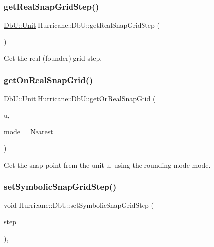 \subsubsection{\texorpdfstring{get\+Real\+Snap\+Grid\+Step()}{getRealSnapGridStep()}}
{\footnotesize\ttfamily \mbox{\hyperlink{group__DbUGroup_ga4fbfa3e8c89347af76c9628ea06c4146}{Db\+U\+::\+Unit}} Hurricane\+::\+Db\+U\+::get\+Real\+Snap\+Grid\+Step (\begin{DoxyParamCaption}{ }\end{DoxyParamCaption})\hspace{0.3cm}{\ttfamily [static]}}

Get the real (founder) grid step. \mbox{\label{group__DbUGroup_ga8746e486f153aa37ee469c1604eba5c0}} 
\subsubsection{\texorpdfstring{get\+On\+Real\+Snap\+Grid()}{getOnRealSnapGrid()}}
{\footnotesize\ttfamily \mbox{\hyperlink{group__DbUGroup_ga4fbfa3e8c89347af76c9628ea06c4146}{Db\+U\+::\+Unit}} Hurricane\+::\+Db\+U\+::get\+On\+Real\+Snap\+Grid (\begin{DoxyParamCaption}\item[{\mbox{\hyperlink{group__DbUGroup_ga4fbfa3e8c89347af76c9628ea06c4146}{Db\+U\+::\+Unit}}}]{u,  }\item[{\mbox{\hyperlink{group__DbUGroup_ga1082168d6f9956ebba22ab8bbec21637}{Db\+U\+::\+Snap\+Mode}}}]{mode = {\ttfamily \mbox{\hyperlink{group__DbUGroup_gga1082168d6f9956ebba22ab8bbec21637a65e6f47eb16779b8974a80d6145a2db5}{Nearest}}} }\end{DoxyParamCaption})\hspace{0.3cm}{\ttfamily [static]}}

Get the snap point from the unit {\ttfamily u}, using the rounding mode {\ttfamily mode}. \mbox{\label{group__DbUGroup_ga9ccd423c8f268ef54770f4663e6c9304}} 
\subsubsection{\texorpdfstring{set\+Symbolic\+Snap\+Grid\+Step()}{setSymbolicSnapGridStep()}}
{\footnotesize\ttfamily void Hurricane\+::\+Db\+U\+::set\+Symbolic\+Snap\+Grid\+Step (\begin{DoxyParamCaption}\item[{\mbox{\hyperlink{group__DbUGroup_ga4fbfa3e8c89347af76c9628ea06c4146}{Db\+U\+::\+Unit}}}]{step }\end{DoxyParamCaption})\hspace{0.3cm}{\ttfamily [inline]}, {\ttfamily [static]}}

